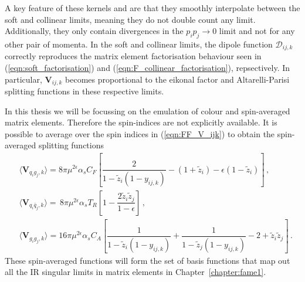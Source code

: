 \documentclass[main.tex]{subfiles}
\begin{document}
        A key feature of these kernels and are that they smoothly interpolate
        between the soft and collinear limits, meaning they do not double count
        any limit. Additionally, they only contain divergences in the
        $p_{i}p_{j} \rightarrow 0$ limit and not for any other pair of
        momenta. In the soft and collinear limits, the dipole function
        $\mathcal{D}_{ij,k}$ correctly reproduces the matrix element factorisation
        behaviour seen in (\ref{eqn:soft_factorisation}) and (\ref{eqn:F_collinear_factorisation}),
        repsectively. In particular, $\boldsymbol{V}_{ij,k}$ becomes
        proportional to the eikonal factor and Altarelli-Parisi splitting
        functions in these respective limits.

        In this thesis we will be focussing on the emulation of
        colour and spin-averaged matrix elements. Therefore the spin-indices
        are not explicitly available. It is possible to average over the spin indices in (\ref{eqn:FF_V_ijk})
        to obtain the spin-averaged splitting functions
        \begin{align}\label{eqn:FF_avg_V_ijk}
            &\langle \boldsymbol{V}_{q_{i}g_{j},k} \rangle = 8\pi \mu^{2\epsilon} \alpha_{s} C_{F} \left[\dfrac{2}{1-\tilde{z}_{i}(1-y_{ij,k})} - (1+\tilde{z}_{i}) - \epsilon(1-\tilde{z}_{i})\right] \, , \nonumber \\
            &\langle \boldsymbol{V}_{q_{i}\bar{q}_{j},k} \rangle = \, 8\pi \mu^{2\epsilon} \alpha_{s} T_{R} \left[1-\dfrac{2\tilde{z}_{i}\tilde{z}_{j}}{1-\epsilon}\right] \, , \nonumber \\
            &\langle \boldsymbol{V}_{g_{i}g_{j},k} \rangle = 16\pi \mu^{2\epsilon} \alpha_{s} C_{A} \left[\dfrac{1}{1-\tilde{z}_{i}(1-y_{ij,k})}+\dfrac{1}{1-\tilde{z}_{j}(1-y_{ij,k})}-2+\tilde{z}_{i}\tilde{z}_{j}\right] \, .
        \end{align}
        These spin-averaged functions will form the set of basis functions
        that map out all the IR singular limits in matrix elements
        in Chapter~\ref{chapter:fame1}.
\end{document}
